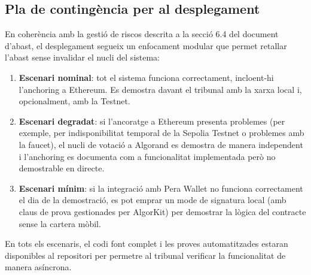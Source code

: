\subsection{Pla de contingència per al desplegament}
 
En coherència amb la gestió de riscos descrita a la secció 6.4 del document d'abast, el desplegament segueix un enfocament modular que permet retallar l'abast sense invalidar el nucli del sistema:
 
\begin{enumerate}[label=\roman*.]
    \item \textbf{Escenari nominal}: tot el sistema funciona correctament, incloent-hi l'anchoring a Ethereum. Es demostra davant el tribunal amb la xarxa local i, opcionalment, amb la Testnet.
 
    \item \textbf{Escenari degradat}: si l'ancoratge a Ethereum presenta problemes (per exemple, per indisponibilitat temporal de la Sepolia Testnet o problemes amb la faucet), el nucli de votació a Algorand es demostra de manera independent i l'anchoring es documenta com a funcionalitat implementada però no demostrable en directe.
 
    \item \textbf{Escenari mínim}: si la integració amb Pera Wallet no funciona correctament el dia de la demostració, es pot emprar un mode de signatura local (amb claus de prova gestionades per AlgorKit) per demostrar la lògica del contracte sense la cartera mòbil.
\end{enumerate}
 
En tots els escenaris, el codi font complet i les proves automatitzades estaran disponibles al repositori per permetre al tribunal verificar la funcionalitat de manera asíncrona.
 